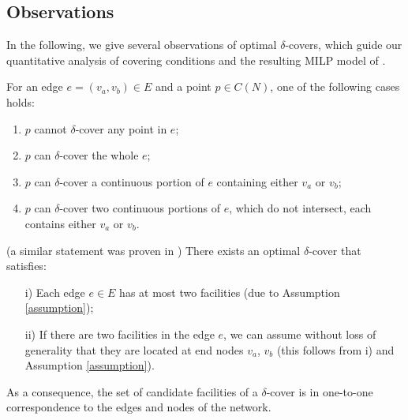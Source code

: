 \subsection{Observations}
In the following, we give several observations of optimal $\delta$-covers, which guide our quantitative analysis of covering conditions and the resulting MILP model of .

\begin{observation}
For an edge $e=(v_a, v_b) \in E$ and a point $p \in C(N)$, one of the following cases holds:
\begin{enumerate}
	\item   $p$ cannot $\delta$-cover any point in $e$;
	\item $p$ can $\delta$-cover the whole $e$;
	\item $p$ can $\delta$-cover a continuous portion of $e$ containing either $v_a$ or $v_b$;
	\item $p$ can $\delta$-cover two continuous portions of $e$, which do not intersect, each contains either $v_a$ or $v_b$.
\end{enumerate}
\end{observation}

\begin{observation}{(a similar statement was proven in \cite{Hamacher20})}
There exists an optimal $\delta$-cover that satisfies:
\begin{enumerate}
	\item[i)] Each edge $e \in E$ has at most two facilities (due to Assumption \ref{assumption});
	\item[ii)] If there are two facilities in the edge $e$, we can assume without loss of generality that they are located at end nodes $v_a$, $v_b$ (this follows from i) and  Assumption \ref{assumption}).
\end{enumerate}
As a consequence, the set of candidate facilities of a $\delta$-cover is in one-to-one correspondence to the edges and nodes of the network.
\end{observation}

